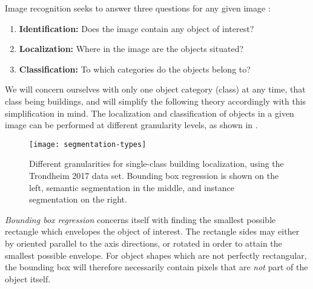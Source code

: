 Image recognition seeks to answer three questions for any given image \cite[p.~1]{image_recognition}:

\begin{enumerate}[nosep]
  \item \textbf{Identification:} Does the image contain any object of interest?
  \item \textbf{Localization:} Where in the image are the objects situated?
  \item \textbf{Classification:} To which categories do the objects belong to?
\end{enumerate}

We will concern ourselves with only one object category (class) at any time, that class being buildings, and will simplify the following theory accordingly with this simplification in mind.
The localization and classification of objects in a given image can be performed at different granularity levels, as shown in .

\begin{figure}[htb]
  \texttt{[image: segmentation-types]}
  \caption{
    Different granularities for single-class building localization, using the Trondheim 2017 data set.
    Bounding box regression is shown on the left, semantic segmentation in the middle, and instance segmentation on the right.
  }
  \label{fig:segmentation-types}
\end{figure}
\newpage

\textit{Bounding box regression} concerns itself with finding the smallest possible rectangle which envelopes the object of interest.
The rectangle sides may either by oriented parallel to the axis directions, or rotated in order to attain the smallest possible envelope.
For object shapes which are not perfectly rectangular, the bounding box will therefore necessarily contain pixels that are \textit{not} part of the object itself.

